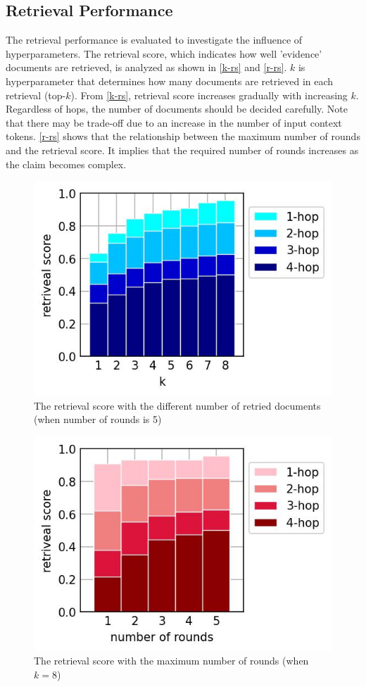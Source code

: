 \documentclass{article}
\begin{document}
\subsection{Retrieval Performance}
The retrieval performance is evaluated to investigate the influence of hyperparameters. The retrieval score, which indicates how well 'evidence' documents are retrieved, is analyzed as shown in \autoref{k-rs} and 
\autoref{r-rs}. $k$ is hyperparameter that determines how many documents are retrieved in each retrieval (top-$k$). From \autoref{k-rs}, retrieval score increases gradually with increasing $k$. Regardless of hops, the number of documents should be decided carefully. Note that there may be trade-off due to an increase in the number of input context tokens. \autoref{r-rs} shows that the relationship between the maximum number of rounds and the retrieval score. It implies that the required number of rounds increases as the claim becomes complex. \par

\begin{figure}[h]
  \centering
  \includegraphics[width=0.6\linewidth]{Figure/k-rs.jpg}
  \caption{\label{k-rs}The retrieval score with the different number of retried documents (when number of rounds is 5)}
\end{figure}
\begin{figure}[h]
  \centering
  \includegraphics[width=0.6\linewidth]{Figure/rounds-rs.jpg}
  \caption{\label{r-rs}The retrieval score with the maximum number of rounds (when $k=8$)}
\end{figure}
\end{document}
